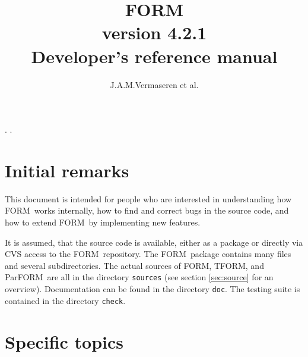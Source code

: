 \documentclass[11pt,titlepage]{article}
\newcommand{\emptypage}{\newpage \thispagestyle{empty} \tiny{.} \normalsize}
\newcommand{\clearemptydoublepage}{\newpage{\pagestyle{empty}\cleardoublepage}}
\newcommand{\C}[1]{{\tt #1}}
\newcommand{\FORM}{{\sc FORM}}
\newcommand{\TFORM}{{\sc TFORM}}
\newcommand{\PARFORM}{{\sc ParFORM}}
\begin{document}
\thispagestyle{empty}
\title{\Huge FORM \\ \Large version 4.2.1 \\ \huge Developer's reference manual}
\date{\formdate}
\author{J.A.M.Vermaseren et al.}
\maketitle

\clearemptydoublepage
\emptypage
\clearemptydoublepage
{}
\setcounter{page}{1}
\clearemptydoublepage
\tableofcontents
\clearemptydoublepage
\emptypage
\clearemptydoublepage
{}
\setcounter{page}{1}

\section{Initial remarks}

This document is intended for people who are interested in understanding how \FORM\ works internally,
how to find and correct bugs in the source code, and how to extend \FORM\ by implementing new
features.

It is assumed, that the source code is available, either as a package or directly via CVS access to
the \FORM\ repository. The \FORM\ package contains many files and several subdirectories. The actual
sources of \FORM, \TFORM, and \PARFORM\ are all in the directory \C{sources} (see section
\ref{sec:source} for an overview).  Documentation can be found in the directory \C{doc}. The testing
suite is contained in the directory \C{check}.





\section{Specific topics}







\printindex
\end{document}
